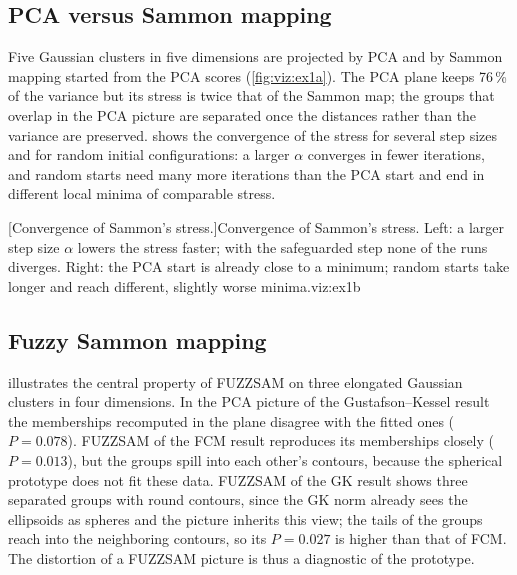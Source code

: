 \subsection{PCA versus Sammon mapping}

Five Gaussian clusters in five dimensions are projected by PCA and by Sammon mapping started from the PCA scores (\cref{fig:viz:ex1a}). The PCA plane keeps 76\,\% of the variance but its stress is twice that of the Sammon map; the groups that overlap in the PCA picture are separated once the distances rather than the variance are preserved.  shows the convergence of the stress for several step sizes and for random initial configurations: a larger $\alpha$ converges in fewer iterations, and random starts need many more iterations than the PCA start and end in different local minima of comparable stress.

[Convergence of Sammon's stress.]{Convergence of Sammon's stress. Left: a larger step size $\alpha$ lowers the stress faster; with the safeguarded step none of the runs diverges. Right: the PCA start is already close to a minimum; random starts take longer and reach different, slightly worse minima.}{viz:ex1b}

\subsection{Fuzzy Sammon mapping}

 illustrates the central property of FUZZSAM on three elongated Gaussian clusters in four dimensions. In the PCA picture of the Gustafson--Kessel result the memberships recomputed in the plane disagree with the fitted ones ($P=0.078$). FUZZSAM of the FCM result reproduces its memberships closely ($P=0.013$), but the groups spill into each other's contours, because the spherical prototype does not fit these data. FUZZSAM of the GK result shows three separated groups with round contours, since the GK norm already sees the ellipsoids as spheres and the picture inherits this view; the tails of the groups reach into the neighboring contours, so its $P=0.027$ is higher than that of FCM. The distortion of a FUZZSAM picture is thus a diagnostic of the prototype.

